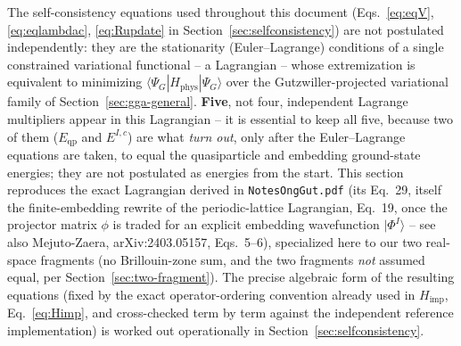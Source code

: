 \documentclass[11pt]{article}
\newcommand{\Himp}{H_{\mathrm{imp}}}
\begin{document}
The self-consistency equations used throughout this document (Eqs.~\eqref{eq:eqV},
\eqref{eq:eqlambdac}, \eqref{eq:Rupdate} in Section~\ref{sec:selfconsistency}) are
not postulated independently: they are the stationarity (Euler--Lagrange)
conditions of a single constrained variational functional -- a Lagrangian --
whose extremization is equivalent to minimizing
$\langle\Psi_G|H_{\mathrm{phys}}|\Psi_G\rangle$ over the Gutzwiller-projected
variational family of Section~\ref{sec:gga-general}. \textbf{Five}, not four,
independent Lagrange multipliers appear in this Lagrangian -- it is essential
to keep all five, because two of them ($E_{\mathrm{qp}}$ and $E^{I,c}$) are
what \emph{turn out}, only after the Euler--Lagrange equations are taken, to
equal the quasiparticle and embedding ground-state energies; they are not
postulated as energies from the start. This section reproduces the exact
Lagrangian derived in \texttt{NotesOngGut.pdf} (its Eq.~29, itself the
finite-embedding rewrite of the periodic-lattice Lagrangian, Eq.~19, once the
projector matrix $\phi$ is traded for an explicit embedding wavefunction
$|\Phi^I\rangle$ -- see also Mejuto-Zaera, arXiv:2403.05157, Eqs.~5--6),
specialized here to our two real-space fragments (no Brillouin-zone sum, and
the two fragments \emph{not} assumed equal, per Section~\ref{sec:two-fragment}).
The precise algebraic form of the resulting equations (fixed by the exact
operator-ordering convention already used in $\Himp$, Eq.~\eqref{eq:Himp},
and cross-checked term by term against the independent reference
implementation) is worked out operationally in Section~\ref{sec:selfconsistency}.
\end{document}
